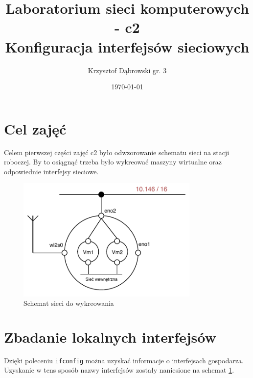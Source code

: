 \documentclass{article}
\title{Laboratorium sieci komputerowych - c2 \\ Konfiguracja interfejsów sieciowych}
\author{Krzysztof Dąbrowski gr. 3}
\date{\today}
\begin{document}
\maketitle{}
\tableofcontents{}

\section{Cel zajęć}
Celem pierwszej części zajęć c2 było odwzorowanie schematu sieci na stacji roboczej. By to osiągnąć trzeba było wykreować maszyny wirtualne oraz odpowiednie interfejsy sieciowe.

\begin{figure}[h]
    \includegraphics[width=0.80\textwidth]{schemat}
    \centering
    \caption{Schemat sieci do wykreowania}
    \label{fig:schemat}
\end{figure}

\section{Zbadanie lokalnych interfejsów}
Dzięki poleceniu \texttt{ifconfig} można uzyskać informacje o interfejsach gospodarza. Uzyskanie w tens sposób nazwy interfejsów zostały naniesione na schemat \ref{fig:schemat}.
\end{document}
